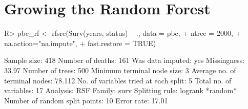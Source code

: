 \documentclass[nojss]{jss}\usepackage[]{graphicx}\usepackage[]{color}
\begin{document}

\section{Growing the Random Forest}


\begin{Schunk}
\begin{Sinput}
R> pbc_rf <- rfsrc(Surv(years, status) ~ ., data = pbc, 
+                   ntree = 2000,
+                   na.action="na.impute", 
+                   fast.restore = TRUE)
\end{Sinput}
\end{Schunk}


\begin{Schunk}
\begin{Soutput}
                         Sample size: 418
                    Number of deaths: 161
                    Was data imputed: yes
                         Missingness: 33.97%
                     Number of trees: 500
          Minimum terminal node size: 3
       Average no. of terminal nodes: 78.112
No. of variables tried at each split: 5
              Total no. of variables: 17
                            Analysis: RSF
                              Family: surv
                      Splitting rule: logrank *random*
       Number of random split points: 10
                          Error rate: 17.01%
\end{Soutput}
\end{Schunk}
\end{document}
